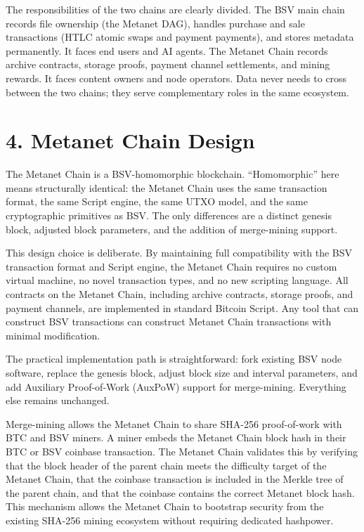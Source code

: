 \documentclass[11pt,a4paper]{article}
\begin{document}
The responsibilities of the two chains are clearly divided. The BSV main chain records file ownership (the Metanet DAG), handles purchase and sale transactions (HTLC atomic swaps and payment payments), and stores metadata permanently. It faces end users and AI agents. The Metanet Chain records archive contracts, storage proofs, payment channel settlements, and mining rewards. It faces content owners and node operators. Data never needs to cross between the two chains; they serve complementary roles in the same ecosystem.

\section{4. Metanet Chain Design}

The Metanet Chain is a BSV-homomorphic blockchain. ``Homomorphic'' here means structurally identical: the Metanet Chain uses the same transaction format, the same Script engine, the same UTXO model, and the same cryptographic primitives as BSV. The only differences are a distinct genesis block, adjusted block parameters, and the addition of merge-mining support.

This design choice is deliberate. By maintaining full compatibility with the BSV transaction format and Script engine, the Metanet Chain requires no custom virtual machine, no novel transaction types, and no new scripting language. All contracts on the Metanet Chain, including archive contracts, storage proofs, and payment channels, are implemented in standard Bitcoin Script. Any tool that can construct BSV transactions can construct Metanet Chain transactions with minimal modification.

The practical implementation path is straightforward: fork existing BSV node software, replace the genesis block, adjust block size and interval parameters, and add Auxiliary Proof-of-Work (AuxPoW) support for merge-mining. Everything else remains unchanged.

Merge-mining allows the Metanet Chain to share SHA-256 proof-of-work with BTC and BSV miners. A miner embeds the Metanet Chain block hash in their BTC or BSV coinbase transaction. The Metanet Chain validates this by verifying that the block header of the parent chain meets the difficulty target of the Metanet Chain, that the coinbase transaction is included in the Merkle tree of the parent chain, and that the coinbase contains the correct Metanet block hash. This mechanism allows the Metanet Chain to bootstrap security from the existing SHA-256 mining ecosystem without requiring dedicated hashpower.
\end{document}
